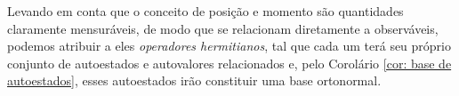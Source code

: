 Levando em conta que o conceito de posição e momento são quantidades claramente mensuráveis, de modo que se relacionam diretamente a observáveis, podemos atribuir a eles \textit{operadores hermitianos}, tal que cada um terá seu próprio conjunto de autoestados e autovalores relacionados e, pelo Corolário \ref{cor: base de autoestados}, esses autoestados irão constituir uma base ortonormal.